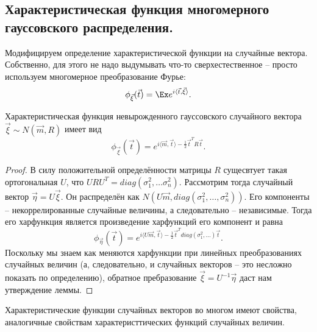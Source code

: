 \subsection{Характеристическая функция многомерного гауссовского распределения.}
\begin{definition}
    Модифицируем определение характеристической функции на случайные вектора.
    Собственно, для этого не надо выдумывать что-то сверхестественное -- просто используем многомерное преобразование Фурье:
    \[
        \phi_{\vec{\xi}}(\vec{t}) = \Ex e^{i \langle \vec{t}, \vec{\xi} \rangle}.
    \]
\end{definition}
\begin{lemma}
    Характеристическая функция невырожденного гауссовского случайного вектора $\vec{\xi} \sim N(\vec{m}, R)$ имеет вид
    \[
        \phi_{\vec{\xi}}(\vec{t}) = e^{i \langle \vec{m}, \vec{t} \rangle - \frac{1}{2} \vec{t}^T R \vec{t}}.
    \]
\end{lemma}
\begin{proof}
    В силу положительной определённости матрицы $R$ сущесвтует такая ортогональная $U$, что $URU^T = diag(\sigma_1^2, \ldots \sigma_n^2)$.
    Рассмотрим тогда случайный вектор $\vec{\eta} = U\vec{\xi}$.
    Он распределён как $N(U\vec{m}, diag(\sigma_1^2, \ldots, \sigma_n^2))$.
    Его компоненты -- некоррелированные случайные величины, а следовательно -- независимые.
    Тогда его харфункция является произведение харфункций его компонент и равна
    \[
        \phi_{\vec{\eta}}(\vec{t}) = e^{i \langle U\vec{m}, \vec{t} \rangle- \frac{1}{2} \vec{t}^T diag(\sigma_1^2, \ldots) \vec{t}}.
    \]
    Поскольку мы знаем как меняются харфункции при линейных преобразованиях случайных величин (а, следовательно, и случайных векторов -- это несложно показать по определению), обратное пребразование $\vec{\xi} = U^{-1}\vec{\eta}$ даст нам утверждение леммы.
\end{proof}
\begin{note}
    Характеристические функции случайных векторов во многом имеют свойства, аналогичные свойствам характеристтических функций случайных величин.
\end{note}

